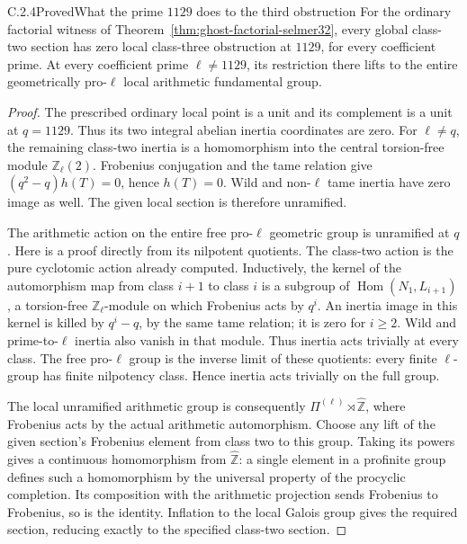 \begin{result}{C.2.4}{Proved}{What the prime \(1129\) does to the third obstruction}
\label{prop:ghost-1129-unramified}
For the ordinary factorial witness of
Theorem~\ref{thm:ghost-factorial-selmer32}, every global
class-two section has zero local class-three obstruction
at \(1129\), for every coefficient prime.
At every coefficient prime \(\ell\ne1129\), its
restriction there lifts to the entire geometrically
pro-\(\ell\) local arithmetic fundamental group.
\end{result}
\begin{proof}
The prescribed ordinary local point is a unit and its
complement is a unit at \(q=1129\). Thus its two
integral abelian inertia coordinates are zero. For
\(\ell\ne q\), the remaining class-two inertia is a
homomorphism into the central torsion-free module
\(\mathbb Z_\ell(2)\). Frobenius conjugation and the
tame relation give \((q^2-q)h(T)=0\), hence \(h(T)=0\).
Wild and non-\(\ell\) tame inertia have zero image as
well. The given local section is therefore unramified.

The arithmetic action on the entire free pro-\(\ell\)
geometric group is unramified at \(q\). Here is a
proof directly from its nilpotent quotients. The
class-two action is the pure cyclotomic action already
computed. Inductively, the kernel of the automorphism
map from class \(i+1\) to class \(i\) is a subgroup
of \(\operatorname{Hom}(N_1,L_{i+1})\), a torsion-free
\(\mathbb Z_\ell\)-module on which Frobenius acts by
\(q^i\). An inertia image in this kernel is killed by
\(q^i-q\), by the same tame relation; it is zero for
\(i\ge2\). Wild and prime-to-\(\ell\) inertia also
vanish in that module. Thus inertia acts trivially at
every class. The free pro-\(\ell\) group is the inverse
limit of these quotients: every finite \(\ell\)-group
has finite nilpotency class. Hence inertia acts trivially
on the full group.

The local unramified arithmetic group is consequently
\(\Pi^{(\ell)}\rtimes\widehat{\mathbb Z}\), where
Frobenius acts by the actual arithmetic automorphism.
Choose any lift of the given section's Frobenius element
from class two to this group. Taking its powers gives
a continuous homomorphism from
\(\widehat{\mathbb Z}\): a single element in a profinite
group defines such a homomorphism by the universal
property of the procyclic completion. Its composition
with the arithmetic projection sends Frobenius to
Frobenius, so is the identity. Inflation to the local
Galois group gives the required section, reducing
exactly to the specified class-two section.


\end{proof}
